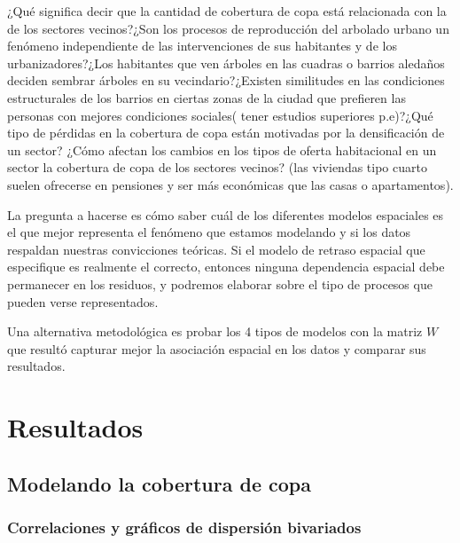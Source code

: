 \documentclass[12pt,]{book}
\begin{document}
¿Qué significa decir que la cantidad de cobertura de copa está
relacionada con la de los sectores vecinos?¿Son los procesos de
reproducción del arbolado urbano un fenómeno independiente de las
intervenciones de sus habitantes y de los urbanizadores?¿Los habitantes
que ven árboles en las cuadras o barrios aledaños deciden sembrar
árboles en su vecindario?¿Existen similitudes en las condiciones
estructurales de los barrios en ciertas zonas de la ciudad que prefieren
las personas con mejores condiciones sociales( tener estudios superiores
p.e)?¿Qué tipo de pérdidas en la cobertura de copa están motivadas por
la densificación de un sector? ¿Cómo afectan los cambios en los tipos de
oferta habitacional en un sector la cobertura de copa de los sectores
vecinos? (las viviendas tipo cuarto suelen ofrecerse en pensiones y ser
más económicas que las casas o apartamentos).

La pregunta a hacerse es cómo saber cuál de los diferentes modelos
espaciales es el que mejor representa el fenómeno que estamos modelando
y si los datos respaldan nuestras convicciones teóricas. Si el modelo de
retraso espacial que especifique es realmente el correcto, entonces
ninguna dependencia espacial debe permanecer en los residuos, y podremos
elaborar sobre el tipo de procesos que pueden verse representados.

Una alternativa metodológica es probar los 4 tipos de modelos con la
matriz \(W\) que resultó capturar mejor la asociación espacial en los
datos y comparar sus resultados.

\chapter{Resultados}\label{results}

\section{Modelando la cobertura de
copa}\label{modelando-la-cobertura-de-copa}

\subsection{Correlaciones y gráficos de dispersión
bivariados}\label{correlaciones-y-graficos-de-dispersion-bivariados}
\end{document}
